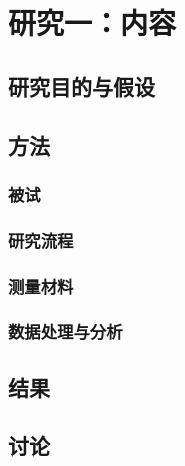 \chapter{研究一：内容}
\section{研究目的与假设}

\section{方法}

\subsection{被试}

\subsection{研究流程}


\subsection{测量材料}


\subsection{数据处理与分析}


\section{结果}

\section{讨论}
